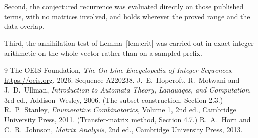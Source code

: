 \documentclass[11pt,a4paper]{article}
\theoremstyle{plain}
\theoremstyle{definition}
\begin{document}
Second, the conjectured recurrence was evaluated directly on those published terms, with no
matrices involved, and holds wherever the proved range and the data overlap.

Third, the annihilation test of Lemma~\ref{lem:crit} was carried out in exact integer
arithmetic on the whole vector rather than on a sampled prefix.

\begin{thebibliography}{9}
 The OEIS Foundation, \emph{The On-Line Encyclopedia of Integer
Sequences}, \url{https://oeis.org}, 2026. Sequence A220238.
 J.~E.~Hopcroft, R.~Motwani and J.~D.~Ullman, \emph{Introduction to Automata
Theory, Languages, and Computation}, 3rd ed., Addison--Wesley, 2006. (The subset
construction, Section 2.3.)
 R.~P.~Stanley, \emph{Enumerative Combinatorics}, Volume 1, 2nd ed.,
Cambridge University Press, 2011. (Transfer-matrix method, Section 4.7.)
 R.~A.~Horn and C.~R.~Johnson, \emph{Matrix Analysis}, 2nd ed., Cambridge
University Press, 2013.
\end{thebibliography}
\end{document}
